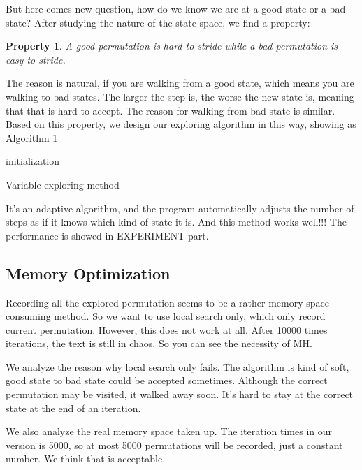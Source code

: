 \documentclass{acmtog} %
\begin{document}
But here comes new question, how do we know we are at a good state or a bad state? After studying the nature of the state space, we find a property:
\newtheorem{myPro}{Property}

\begin{myPro}
    A good permutation is hard to stride while a bad permutation is easy to stride.
\end{myPro}
The reason is natural, if you are walking from a good state, which means you are walking to bad states. The larger the step is, the worse the new state is, meaning that that is hard to accept. The reason for walking from bad state is similar. Based on this property, we design our exploring algorithm in this way, showing as Algorithm 1
\begin{algorithm}[htb]
	\SetAlgoLined
	initialization\;
	\caption{Variable exploring method}
\end{algorithm}
It's an adaptive algorithm, and the program automatically adjusts the number of steps as if it knows which kind of state it is. And this method works well!!!  The performance is showed in EXPERIMENT part.

\subsection{Memory Optimization}
Recording all the explored permutation seems to be a rather memory space consuming method. So we want to use local search only, which only record current permutation. However, this does not work at all. After 10000 times iterations, the text is still in chaos. So you can see the necessity of MH.

We analyze the reason why local search only fails. The algorithm is kind of soft, good state to bad state could be accepted sometimes. Although the correct permutation may be visited, it walked away soon. It's hard to stay at the correct state at the end of an iteration.

We also analyze the real memory space taken up. The iteration times in our version is 5000, so at most 5000 permutations will be recorded, just a constant number. We think that is acceptable.
\end{document}
